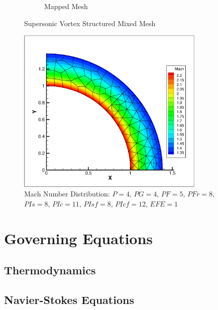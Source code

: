 \documentclass[12pt,Bold,letterpaper,TexShade]{mcgilletdclass}
\numberwithin{equation}{section}
\begin{document}
\begin{figure}
\begin{subfigure}[b]{0.45\textwidth}
        \caption{Mapped Mesh}
    \end{subfigure}
    \caption{Supersonic Vortex Structured Mixed Mesh}
    \label{fig:SupersonicVortexStructuredML1P4}
\end{figure}


\begin{figure}[ht!] 
\centering
\includegraphics[width=0.8\textwidth]{./figures/SupersonicVortexMachDist_ML1P4.eps}
\caption{Mach Number Distribution: $P=4$, $PG=4$, $PF=5$, $PFr=8$, $PIs =8$, $PIc =11$, $PIsf =8$, $PIcf =12$, $EFE = 1$}
\label{fig:MachDistP4PG4PF5PFr8PIs8PIc11PIsf8PIcf12EFE1}
\end{figure}



\chapter{Governing Equations}

\section{Thermodynamics}

\section{Navier-Stokes Equations}

\end{document}
